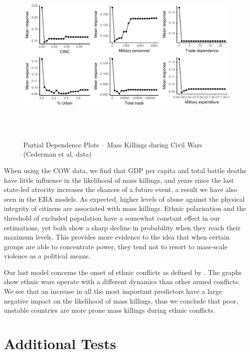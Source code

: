 \begin{figure}[h!]
\begin{center}
\includegraphics[width=\textwidth, height=9cm]{images/drfdpp4.pdf}
\caption{Partial Dependence Plots -- Mass Killings during Civil Wars (Cederman et al. data)}
\label{fig:drfdpp4}
\end{center}
\end{figure}

\newpage

When using the COW data, we find that GDP per capita and total battle deaths have little influence in the likelihood of mass killings, and years since the last state-led atrocity increases the chances of a future event, a result we have also seen in the EBA models. As expected, higher levels of abuse against the physical integrity of citizens are associated with mass killings. Ethnic polarisation and the threshold of excluded population have a somewhat constant effect in our estimations, yet both show a sharp decline in probability when they reach their maximum levels. This provides more evidence to the idea that when certain groups are able to concentrate power, they tend not to resort to mass-scale violence as a political means.

Our last model concerns the onset of ethnic conflicts as defined by \citet{cederman2010ethnic}. The graphs show ethnic wars operate with a different dynamics than other armed conflicts. We see that an increase in all the most important predictors have a large negative impact on the likelihood of mass killings, thus we conclude that poor, unstable countries are more prone mass killings during ethnic conflicts.

\section{Additional Tests}
\label{sec:additional-tests4}

